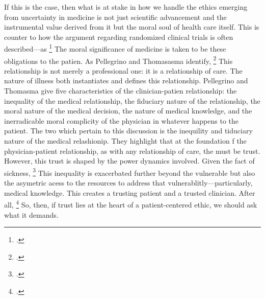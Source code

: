 \documentclass[letterpaper,notitlepage,12pt]{article}
\begin{document}
If this is the case, then what is at stake in how we handle the ethics emerging
from uncertainty in medicine is not just scientific advancement and the
instrumental value derived from it but the moral soul of health care itself.
This is counter to how the argument regarding randomized clinical trials is
often described---as \footcite[p. 4]{schafer_commentary_1985}
The moral significance of medicine is taken to be these obligations to the
patien.
As Pellegrino and Thomasasma identify, \footcite[p. 40]{pellegrino_virtues_1993}
This relationship is not merely a professional one: it is a relationship of
care.
The nature of illness both instantiates and defines this relationship.
Pellegrino and Thomasma give five characteristics of the clinician-patien
relationship: the inequality of the medical relationship, the fiduciary nature 
of the relationship, the moral nature of the medical decision, the nature of 
medical knowledge, and the inerradicable moral complicity of the physician in
whatever happens to the patient.
The two which pertain to this discussion is the inequility and tiduciary
nature of the medical relashionip.
They highlight that at the foundation f the physician-patient relationship, as
with any relationship of care, the must be trust.
However, this trust is shaped by the power dynamics involved.
Given the fact of sickness, \footcite[p.
42]{pellegrino_virtues_1993}
This inequality is exacerbated further beyond the vulnerable but also the
asymetric acess to the resources to address that vulnerablitly---particularly,
medical knowledge.
This creates a trusting patient and a trusted clinician.
After all, \footcite[p. 68]{pellegrino_virtues_1993}
So, then, if trust lies at the heart of a patient-centered ethic, we should ask
what it demands.
\end{document}

